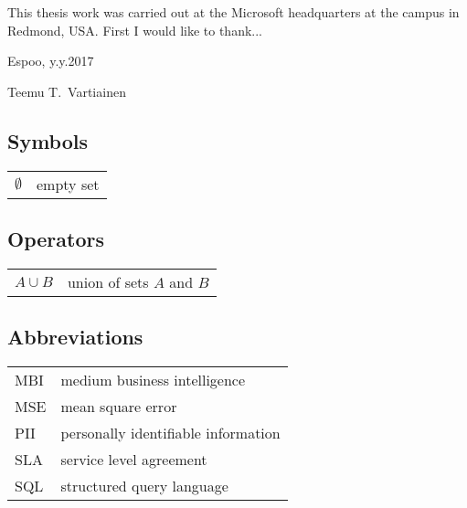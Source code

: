 \documentclass[english,12pt,a4paper,pdftex,sci,utf8]{aaltothesis}
\begin{document}

This thesis work was carried out at the Microsoft headquarters at the campus in Redmond, USA.
First I would like to thank...


\vspace{5cm}
Espoo, y.y.2017

\vspace{5mm}
{\hfill Teemu T.\ Vartiainen \hspace{1cm}}

\newpage


\thesistableofcontents



\subsection*{Symbols}

\begin{tabular}{ll}
$\emptyset$  & empty set \\
\end{tabular}

\subsection*{Operators}

\begin{tabular}{ll}
$A \cup B$    & union of sets $A$ and $B$ \\
\end{tabular}

\subsection*{Abbreviations}

\begin{tabular}{ll}
MBI         & medium business intelligence \\
MSE         & mean square error \\
PII         & personally identifiable information \\
SLA         & service level agreement \\
SQL         & structured query language \\
\end{tabular}
\end{document}
